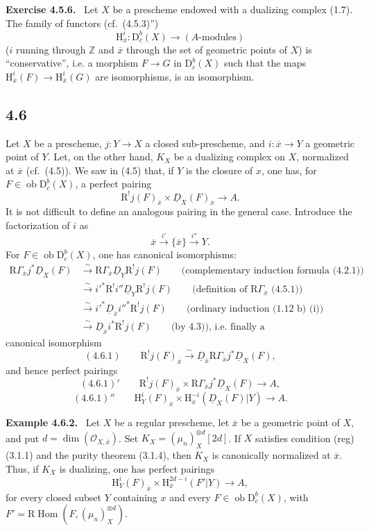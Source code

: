 \documentclass[11pt]{article}
\providecommand{\cO}{\mathcal{O}}
\newenvironment{statement}[1]{\par\medskip\noindent\textbf{#1.}\ }{\par\medskip}
\renewcommand{\H}{\mathrm{H}}
\DeclareMathOperator{\Hom}{Hom}
\newcommand{\R}{\mathrm{R}}
\newcommand{\D}{\mathrm{D}}
\newcommand{\Z}{\mathbb{Z}}
\newcommand{\ob}{\operatorname{ob}}
\newcommand{\ol}[1]{\overline{#1}}
\providecommand{\Hom}{\operatorname{Hom}}
\providecommand{\ob}{\operatorname{ob}}
\providecommand{\R}{\mathrm R}
\providecommand{\Z}{\mathbb Z}
\providecommand{\Hom}{\operatorname{Hom}}
\begin{document}
\begin{statement}{Exercise 4.5.6}
Let $X$ be a prescheme endowed with a dualizing complex (1.7). The family of functors (cf.~(4.5.3)'')
\[
\H_{\ol{x}}^i:\D_c^b(X)\longrightarrow (A\text{-modules})
\]
($i$ running through $\Z$ and $\ol{x}$ through the set of geometric points of $X$) is ``conservative'', i.e. a morphism $F\to G$ in $\D_c^b(X)$ such that the maps $\H_{\ol{x}}^i(F)\to\H_{\ol{x}}^i(G)$ are isomorphisms, is an isomorphism.
\end{statement}

\subsection*{4.6}
Let $X$ be a prescheme, $j:Y\to X$ a closed sub-prescheme, and $i:\ol{x}\to Y$ a geometric point of $Y$. Let, on the other hand, $K_X$ be a dualizing complex on $X$, normalized at $\ol{x}$ (cf.~(4.5)). We saw in (4.5) that, if $Y$ is the closure of $x$, one has, for $F\in\ob\D_c^b(X)$, a perfect pairing
\[
\R^{!}j(F)_{\ol{x}}\times \underline{D}_X(F)_{\ol{x}}\longrightarrow A.
\]
It is not difficult to define an analogous pairing in the general case. Introduce the factorization of $i$ as
\[
\ol{x}\xrightarrow{i'}\{\ol{x}\}\xrightarrow{i''}Y.
\]
For $F\in\ob\D_c^b(X)$, one has canonical isomorphisms:
\[
\begin{aligned}
\R\Gamma_{\ol{x}}j^*\underline{D}_X(F)&\xrightarrow{\sim}\R\Gamma_{\ol{x}}\underline{D}_Y\R^{!}j(F)\qquad\text{(complementary induction formula (4.2.1))}\\
&\xrightarrow{\sim}i'^*\R^{!}i''\underline{D}_Y\R^{!}j(F)\qquad\text{(definition of $\R\Gamma_{\ol{x}}$ (4.5.1))}\\
&\xrightarrow{\sim}i'^*\underline{D}_{\ol{x}}i''^*\R^{!}j(F)\qquad\text{(ordinary induction (1.12 b) (i))}\\
&\xrightarrow{\sim}\underline{D}_{\ol{x}}i^*\R^{!}j(F)\qquad\text{(by 4.3)), i.e. finally a}
\end{aligned}
\]
canonical isomorphism
\[
(4.6.1)\qquad \R^{!}j(F)_{\ol{x}}\xrightarrow{\sim}\underline{D}_{\ol{x}}\R\Gamma_{\ol{x}}j^*\underline{D}_X(F),
\]
and hence perfect pairings
\[
(4.6.1)'\qquad \R^{!}j(F)_{\ol{x}}\times \R\Gamma_{\ol{x}}j^*\underline{D}_X(F)\longrightarrow A,
\]
\[
(4.6.1)''\qquad \H_Y^i(F)_{\ol{x}}\times \H_{\ol{x}}^{-i}(\underline{D}_X(F)|Y)\longrightarrow A.
\]

\begin{statement}{Example 4.6.2}
Let $X$ be a regular prescheme, let $\ol{x}$ be a geometric point of $X$, and put $d=\dim(\cO_{X,\ol{x}})$. Set $K_X=(\mu_n)_X^{\otimes d}[2d]$. If $X$ satisfies condition (reg) (3.1.1) and the purity theorem (3.1.4), then $K_X$ is canonically normalized at $\ol{x}$. Thus, if $K_X$ is dualizing, one has perfect pairings
\[
\H_Y^i(F)_{\ol{x}}\times \H_{\ol{x}}^{2d-i}(F'|Y)\longrightarrow A,
\]
for every closed subset $Y$ containing $x$ and every $F\in\ob\D_c^b(X)$, with $F'=\R\Hom(F,(\mu_n)_X^{\otimes d})$.
\end{statement}
\end{document}
